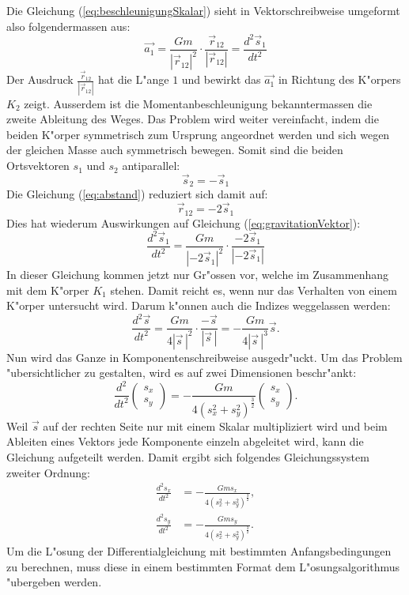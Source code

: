 \begin{refsection}
Die Gleichung (\ref{eq:beschleunigungSkalar}) sieht in Vektorschreibweise umgeformt also folgendermassen aus:
\begin{equation} \label{eq:gravitationVektor}
\vec{a_1} =\frac{G m}{| \vec{r}_{12}|^2}\cdot \frac{\vec{r}_{12}}{| \vec{r}_{12}|}=  \frac{d^2 \vec{s}_1}{dt^2}
\end{equation}
Der Ausdruck $\frac{\vec{r}_{12}}{| \vec{r}_{12}|}$ hat die L"ange $1$ und bewirkt das $\vec{a_1}$ in Richtung des K"orpers $K_2$ zeigt.
Ausserdem ist die Momentanbeschleunigung bekanntermassen die zweite Ableitung des Weges. 
Das Problem wird weiter vereinfacht, indem die beiden K"orper symmetrisch zum Ursprung angeordnet werden und sich wegen der gleichen Masse auch symmetrisch bewegen.
Somit sind die beiden Ortsvektoren $s_1$ und $s_2$ antiparallel:
\[
\vec{s}_2=-\vec{s}_1
\]
Die Gleichung (\ref{eq:abstand}) reduziert sich damit auf:
\[
\vec{r}_{12}= -2\vec{s}_1
\]
Dies hat wiederum Auswirkungen auf Gleichung (\ref{eq:gravitationVektor}):
\[
\frac{d^2 \vec{s}_1}{dt^2} =\frac{G m}{| -2\vec{s}_{1}|^2}\cdot \frac{-2\vec{s}_{1}}{| -2\vec{s}_{1}|}
\]
In dieser Gleichung kommen jetzt nur Gr"ossen vor, welche im Zusammenhang mit dem K"orper $K_1$ stehen.
Damit reicht es, wenn nur das Verhalten von einem K"orper untersucht wird. 
Darum k"onnen auch die Indizes weggelassen werden:
\[
\frac{d^2\vec{s}}{dt^2}=\frac{G m}{4|\vec{s}\,|^2}\cdot\frac{-\vec{s}}{|\vec{s}\,|}=-\frac{G m}{4|\vec{s}\,|^3}{\vec{s}}.
\]
Nun wird das Ganze in Komponentenschreibweise ausgedr"uckt.
Um das Problem "ubersichtlicher zu gestalten, wird es auf zwei Dimensionen beschr"ankt:
\[
\frac{d^2}{dt^2}
\begin{pmatrix}
s_x \\ s_y
\end{pmatrix}
=
-\frac{G m}{4(s_x^2 + s_y^2)^\frac32}
\begin{pmatrix}
s_x \\ s_y
\end{pmatrix}.
\]
Weil $\vec{s}$ auf der rechten Seite nur mit einem Skalar multipliziert wird und beim Ableiten eines Vektors jede Komponente einzeln abgeleitet wird, kann die Gleichung aufgeteilt werden.
Damit ergibt sich folgendes Gleichungssystem zweiter Ordnung:
\begin{align}
\frac{d^2s_x}{dt^2}&=-\frac{G m s_x}{4(s_x^2 + s_y^2)^\frac32},
\label{eq:kompSchreibwEins}
\\
\frac{d^2s_y}{dt^2}&=-\frac{G m s_y}{4(s_x^2 + s_y^2)^\frac32}.
\label{eq:kompSchreibwZwei}
\end{align}
Um die L"osung der Differentialgleichung mit bestimmten Anfangsbedingungen zu berechnen, muss diese in einem bestimmten Format dem L"osungsalgorithmus "ubergeben werden.

\end{refsection}
